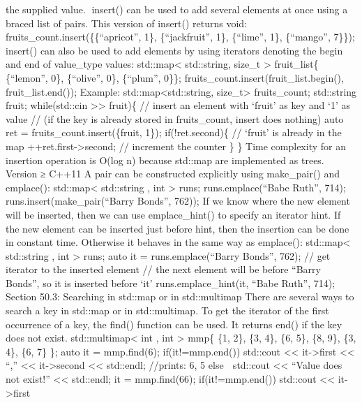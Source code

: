 the supplied value. insert() can be used to add several elements at
once using a braced list of pairs. This version of insert() returns
void: fruits\_count.insert(\{\{``apricot'', 1\}, \{``jackfruit'', 1\},
\{``lime'', 1\}, \{``mango'', 7\}\}); insert() can also be used to add
elements by using iterators denoting the begin and end of value\_type
values: std::map\textless{} std::string, size\_t \textgreater{}
fruit\_list\{ \{``lemon'', 0\}, \{``olive'', 0\}, \{``plum'', 0\}\};
fruits\_count.insert(fruit\_list.begin(), fruit\_list.end()); Example:
std::map\textless std::string, size\_t\textgreater{} fruits\_count;
std::string fruit; while(std::cin \textgreater\textgreater{} fruit)\{ //
insert an element with `fruit' as key and `1' as value // (if the key is
already stored in fruits\_count, insert does nothing) auto ret =
fruits\_count.insert(\{fruit, 1\}); if(!ret.second)\{ // `fruit' is
already in the map ++ret.first-\textgreater second; // increment the
counter \} \} Time complexity for an insertion operation is O(log n)
because std::map are implemented as trees. Version ≥ C++11 A pair can be
constructed explicitly using make\_pair() and emplace():
std::map\textless{} std::string , int \textgreater{} runs;
runs.emplace(``Babe Ruth'', 714); runs.insert(make\_pair(``Barry
Bonds'', 762)); If we know where the new element will be inserted, then
we can use emplace\_hint() to specify an iterator hint. If the new
element can be inserted just before hint, then the insertion can be done
in constant time. Otherwise it behaves in the same way as emplace():
std::map\textless{} std::string , int \textgreater{} runs; auto it =
runs.emplace(``Barry Bonds'', 762); // get iterator to the inserted
element // the next element will be before ``Barry Bonds'', so it is
inserted before `it' runs.emplace\_hint(it, ``Babe Ruth'', 714); Section
50.3: Searching in std::map or in std::multimap There are several ways
to search a key in std::map or in std::multimap. To get the iterator of
the ﬁrst occurrence of a key, the find() function can be used. It
returns end() if the key does not exist. std::multimap\textless{} int ,
int \textgreater{} mmp\{ \{1, 2\}, \{3, 4\}, \{6, 5\}, \{8, 9\}, \{3,
4\}, \{6, 7\} \}; auto it = mmp.find(6); if(it!=mmp.end()) std::cout
\textless\textless{} it-\textgreater first \textless\textless{} ``,''
\textless\textless{} it-\textgreater second \textless\textless{}
std::endl; //prints: 6, 5 else  std::cout \textless\textless{} ``Value
does not exist!'' \textless\textless{} std::endl; it = mmp.find(66);
if(it!=mmp.end()) std::cout \textless\textless{} it-\textgreater first
